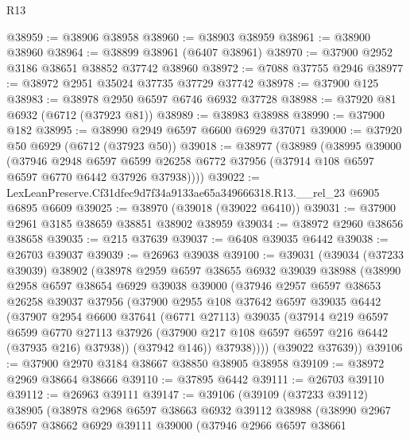 \begin{lexlean}{R13}
\begin{coremodule}
@38959 := @38906 @38958
@38960 := @38903 @38959
@38961 := @38900 @38960
@38964 := @38899 @38961 (@6407 @38961)
@38970 := @37900 @2952 @3186 @38651 @38852 @37742 @38960
@38972 := @7088 @37755 @2946
@38977 := @38972 @2951 @35024 @37735 @37729 @37742
@38978 := @37900 @125
@38983 := @38978 @2950 @6597 @6746 @6932 @37728
@38988 := @37920 @81 @6932 (@6712 (@37923 @81))
@38989 := @38983 @38988
@38990 := @37900 @182
@38995 := @38990 @2949 @6597 @6600 @6929 @37071
@39000 := @37920 @50 @6929 (@6712 (@37923 @50))
@39018 := @38977
    (@38989
      (@38995
        @39000
        (@37946
          @2948
          @6597
          @6599
          @26258
          @6772
          @37956
          (@37914 @108 @6597 @6597 @6770 @6442 @37926 @37938))))
@39022 := LexLeanPreserve.Cf31dfec9d7f34a9133ae65a349666318.R13.__rel_23 @6905 @6895 @6609
@39025 := @38970 (@39018 (@39022 @6410))
@39031 := @37900 @2961 @3185 @38659 @38851 @38902 @38959
@39034 := @38972 @2960 @38656 @38658
@39035 := @215 @37639
@39037 := @6408 @39035 @6442
@39038 := @26703 @39037
@39039 := @26963 @39038
@39100 := @39031
    (@39034
      (@37233 @39039)
      @38902
      (@38978
        @2959
        @6597
        @38655
        @6932
        @39039
        @38988
        (@38990
          @2958
          @6597
          @38654
          @6929
          @39038
          @39000
          (@37946
            @2957
            @6597
            @38653
            @26258
            @39037
            @37956
            (@37900
              @2955
              @108
              @37642
              @6597
              @39035
              @6442
              (@37907
                @2954
                @6600
                @37641
                (@6771 @27113)
                @39035
                (@37914
                  @219
                  @6597
                  @6599
                  @6770
                  @27113
                  @37926
                  (@37900 @217 @108 @6597 @6597 @216 @6442 (@37935 @216) @37938))
                (@37942 @146))
              @37938))))
      (@39022 @37639))
@39106 := @37900 @2970 @3184 @38667 @38850 @38905 @38958
@39109 := @38972 @2969 @38664 @38666
@39110 := @37895 @6442
@39111 := @26703 @39110
@39112 := @26963 @39111
@39147 := @39106
    (@39109
      (@37233 @39112)
      @38905
      (@38978
        @2968
        @6597
        @38663
        @6932
        @39112
        @38988
        (@38990
          @2967
          @6597
          @38662
          @6929
          @39111
          @39000
          (@37946
            @2966
            @6597
            @38661

\end{coremodule}
\end{lexlean}
